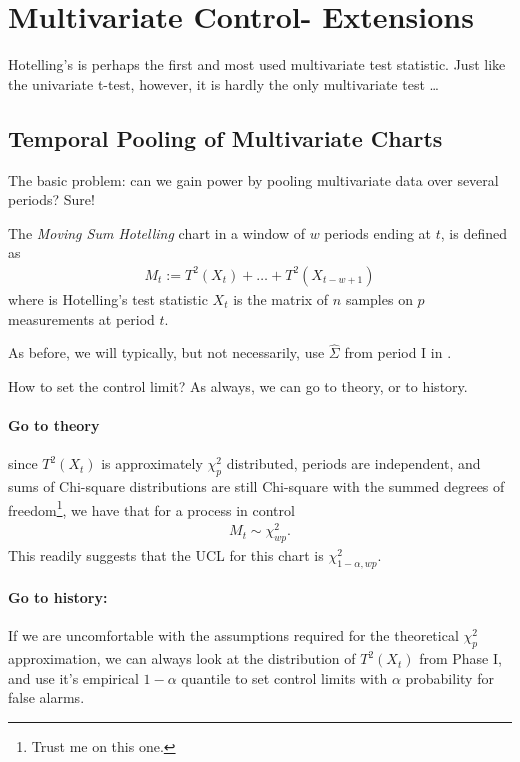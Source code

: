 \section[Multivariate extensions]{Multivariate Control- Extensions}

Hotelling's \tsq is perhaps the first and most used multivariate test statistic.
Just like the univariate t-test, however, it is hardly the only multivariate test \dots





\subsection{Temporal Pooling of Multivariate Charts}
The basic problem: can we gain power by pooling multivariate data over several periods?
Sure!

\begin{definition}
	The \emph{Moving Sum Hotelling} chart in a window of $w$ periods ending at $t$, is defined as
	\begin{align}
	M_t:= T^2(X_t)+\dots+T^2(X_{t-w+1})
	\end{align}
	where \tsq is Hotelling's test statistic $X_t$ is the matrix of $n$ samples on $p$ measurements at period $t$. 
\end{definition}
As before, we will typically, but not necessarily, use $\hat{\Sigma}$ from period I in \tsq. 

How to set the control limit? 
As always, we can go to theory, or to history.

\paragraph{Go to theory}
since $T^2(X_t)$ is approximately $\chi^2_p$ distributed, periods are independent, and sums of Chi-square distributions are still Chi-square with the summed degrees of freedom\footnote{Trust me on this one.}, we have that for a process in control
\begin{align}
M_t \sim \chi^2_{wp}.
\end{align}
This readily suggests that the UCL for this chart is $\chi^2_{1-\alpha,wp}$. 

\paragraph{Go to history:}
If we are uncomfortable with the assumptions required for the theoretical $\chi^2_p$ approximation, we can always look at the distribution of $T^2(X_t)$ from Phase I, and use it's empirical $1-\alpha$ quantile to set control limits with $\alpha$ probability for false alarms.



